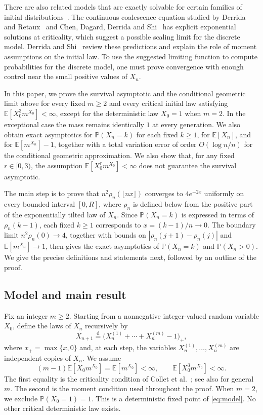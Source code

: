 \documentclass[11pt,letterpaper,reqno]{amsart}
\numberwithin{equation}{section}
\theoremstyle{plain}
\theoremstyle{remark}
\newcommand{\E}{\mathbb E}\newcommand{\Pp}{\mathbb P}
\newcommand{\floor}[1]{\lfloor#1\rfloor}
\begin{document}
There are also related models that are exactly solvable for certain families of initial distributions~\cite{HMP,LZ,AHM}. The continuous coalescence equation studied by Derrida and Retaux~\cite[Section~3.2]{DR} and Chen, Dagard, Derrida and Shi~\cite[Section~2]{CDDS} has explicit exponential solutions at criticality, which suggest a possible scaling limit for the discrete model. Derrida and Shi~\cite{DS} review these predictions and explain the role of moment assumptions on the initial law. To use the suggested limiting function to compute probabilities for the discrete model, one must prove convergence with enough control near the small positive values of $X_n$.

In this paper, we prove the survival asymptotic and the conditional geometric limit above for every fixed $m\ge2$ and every critical initial law satisfying $\E[X_0^3m^{X_0}]<\infty$, except for the deterministic law $X_0=1$ when $m=2$. In the exceptional case the mass remains identically $1$ at every generation. We also obtain exact asymptotics for $\Pp(X_n=k)$ for each fixed $k\ge1$, for $\E[X_n]$, and for $\E[m^{X_n}]-1$, together with a total variation error of order $O(\log n/n)$ for the conditional geometric approximation. We also show that, for any fixed $r\in[0,3)$, the assumption $\E[X_0^rm^{X_0}]<\infty$ does not guarantee the survival asymptotic.

The main step is to prove that $n^2\rho_n(\floor{nx})$ converges to $4e^{-2x}$ uniformly on every bounded interval $[0,R]$, where $\rho_n$ is defined below from the positive part of the exponentially tilted law of $X_n$. Since $\Pp(X_n=k)$ is expressed in terms of $\rho_n(k-1)$, each fixed $k\ge1$ corresponds to $x=(k-1)/n\to0$. The boundary limit $n^2\rho_n(0)\to4$, together with bounds on $|\rho_n(j+1)-\rho_n(j)|$ and $\E[m^{X_n}]\to1$, then gives the exact asymptotics of $\Pp(X_n=k)$ and $\Pp(X_n>0)$. We give the precise definitions and statements next, followed by an outline of the proof.

\subsection{Model and main result}
Fix an integer $m\ge2$. Starting from a nonnegative integer-valued random variable $X_0$, define the laws of $X_n$ recursively by
\begin{equation}\label{eq:model}
 X_{n+1}\overset{\mathrm d}=\bigl(X_n^{(1)}+\cdots+X_n^{(m)}-1\bigr)_+,
\end{equation}
where $x_+=\max\{x,0\}$ and, at each step, the variables $X_n^{(1)},\ldots,X_n^{(m)}$ are independent copies of $X_n$. We assume
\begin{equation}\label{eq:assumptions}
 (m-1)\E[X_0m^{X_0}]=\E[m^{X_0}]<\infty,
 \qquad \E[X_0^3m^{X_0}]<\infty.
\end{equation}
The first equality is the criticality condition of Collet et al.~\cite{CEGM}; see also \cite[Theorem~1]{CDHLS} for general $m$. The second is the moment condition used throughout the proof.
When $m=2$, we exclude $\Pp(X_0=1)=1$. This is a deterministic fixed point of \eqref{eq:model}. No other critical deterministic law exists.
\end{document}

